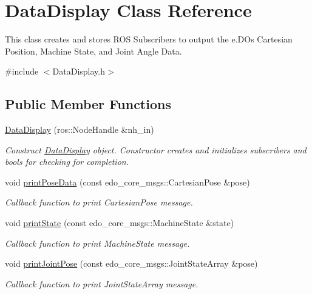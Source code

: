 \hypertarget{classDataDisplay}{}\section{Data\+Display Class Reference}
\label{classDataDisplay}


This class creates and stores R\+OS Subscribers to output the e.\+DO\textquotesingle{}s Cartesian Position, Machine State, and Joint Angle Data.  




{\ttfamily \#include $<$Data\+Display.\+h$>$}

\subsection*{Public Member Functions}
\begin{DoxyCompactItemize}
\item 
\hyperlink{classDataDisplay_a342831578fde7f92c5166f273c3b71d6}{Data\+Display} (ros\+::\+Node\+Handle \&nh\+\_\+in)
\begin{DoxyCompactList}\small\item\em Construct \hyperlink{classDataDisplay}{Data\+Display} object. Constructor creates and initializes subscribers and bools for checking for completion. \end{DoxyCompactList}\item 
void \hyperlink{classDataDisplay_ac07899841fb2eaffd0be559bb36ebc3d}{print\+Pose\+Data} (const edo\+\_\+core\+\_\+msgs\+::\+Cartesian\+Pose \&pose)
\begin{DoxyCompactList}\small\item\em Callback function to print Cartesian\+Pose message. \end{DoxyCompactList}\item 
void \hyperlink{classDataDisplay_a9747a7db56b95c7698da4d07777ac10e}{print\+State} (const edo\+\_\+core\+\_\+msgs\+::\+Machine\+State \&state)
\begin{DoxyCompactList}\small\item\em Callback function to print Machine\+State message. \end{DoxyCompactList}\item 
void \hyperlink{classDataDisplay_aed94e838a235581ea4c96aaca9f06d63}{print\+Joint\+Pose} (const edo\+\_\+core\+\_\+msgs\+::\+Joint\+State\+Array \&pose)
\begin{DoxyCompactList}\small\item\em Callback function to print Joint\+State\+Array message. \end{DoxyCompactList}\item 

\end{DoxyCompactItemize}
